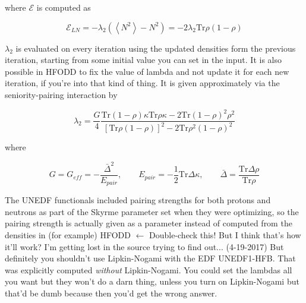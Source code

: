 \noindent where $\mathcal{E}$ is computed as

\begin{equation*}
\mathcal{E}_{LN} = -\lambda_2\left(\left\langle N^2\right\rangle -N^2\right) = -2\lambda_2 \mathrm{Tr}\rho\left(1-\rho\right)
\end{equation*}

$\lambda_2$ is evaluated on every iteration using the updated densities form the previous iteration, starting from some initial value you can set in the input. It is also possible in HFODD to fix the value of lambda and not update it for each new iteration, if you're into that kind of thing. It is given approximately via the seniority-pairing interaction by

\begin{equation*}
\lambda_2 = \frac{G}{4}\frac{\mathrm{Tr}(1-\rho)\kappa \mathrm{Tr}\rho\kappa-2\mathrm{Tr}(1-\rho)^2\rho^2}{\left[\mathrm{Tr}\rho(1-\rho)\right]^2-2\mathrm{Tr}\rho^2(1-\rho)^2}
\end{equation*}

\noindent where

\begin{equation*}
G = G_{eff} = -\frac{\bar{\Delta}^2}{E_{pair}}, \qquad E_{pair} = -\frac{1}{2}\mathrm{Tr}\Delta\kappa, \qquad \bar{\Delta} = \frac{\mathrm{Tr}\Delta\rho}{\mathrm{Tr}\rho}
\end{equation*}

The UNEDF functionals included pairing strengths for both protons and neutrons as part of the Skyrme parameter set when they were optimizing, so the pairing strength is actually given as a parameter instead of computed from the densities in (for example) HFODD $\leftarrow$ Double-check this! But I think that's how it'll work? I'm getting lost in the source trying to find out... (4-19-2017) But definitely you shouldn't use Lipkin-Nogami with the EDF UNEDF1-HFB. That was explicitly computed \textit{without} Lipkin-Nogami. You could set the lambdas all you want but they won't do a darn thing, unless you turn on Lipkin-Nogami but that'd be dumb because then you'd get the wrong answer.

